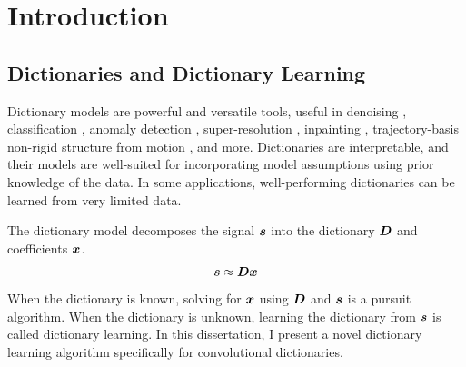 \chapter{Introduction}


\section{Dictionaries and Dictionary Learning}
Dictionary models are powerful and versatile tools, useful in denoising \cite{wohlberg2016convolutional}, classification \cite{kong2012dictionary}, anomaly detection \cite{carroll2017outlier}, super-resolution \cite{polatkan2014bayesian}\cite{gu2015convolutional}, inpainting \cite{papyan2017convolutional}, trajectory-basis non-rigid structure from motion \cite{zhu2013convolutional}\cite{chodosh2020use}, and more. Dictionaries are interpretable, and their models are well-suited for incorporating model assumptions using prior knowledge of the data. In some applications, well-performing dictionaries can be learned from very limited data.

The dictionary model decomposes the signal $\bm{s}$ into the dictionary $\bm{D}$ and coefficients $\bm{x}$.
%
\begin{equation}
\bm{s} \approx \bm{D}\bm{x}
\end{equation}
%
When the dictionary is known, solving for $\bm{x}$ using $\bm{D}$ and $\bm{s}$ is a pursuit algorithm. When the dictionary is unknown, learning the dictionary from $\bm{s}$ is called dictionary learning. In this dissertation, I present a novel dictionary learning algorithm specifically for convolutional dictionaries.

